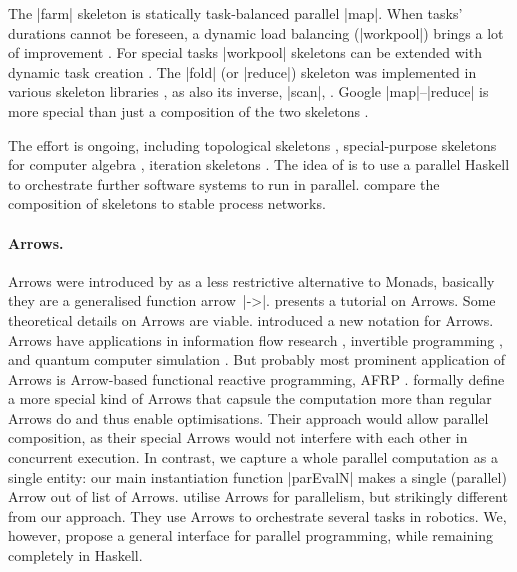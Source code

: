 The |farm| skeleton \citep{Hey1990185,Eden:PPDP01,Kuchen05} is statically task-balanced parallel |map|. When tasks' durations cannot be foreseen, a dynamic load balancing (|workpool|) brings a lot of improvement \citep{Rudolph:1991:SLB:113379.113401,Eden:PPL03,Hippold2006,PADL08HMWS,Marlow2009}. For special tasks |workpool| skeletons can be extended with dynamic task creation \cite{WPEuropar06,Dinan:2009:SWS:1654059.1654113,brown2010ever}.
%
The |fold| (or |reduce|) skeleton was implemented in various skeleton libraries \cite{Kuchen2002,BUONO20102095,Dastgeer:2011:ASM:1984693.1984697,5361825}, as also its inverse, |scan|, \cite{Bischof2002,harris2007parallel}.
%
Google |map|--|reduce| is more special than just a composition of the two skeletons \cite{LAMMEL20081,Berthold2009-mr}.

The effort is ongoing, including topological skeletons \cite{Eden:PARCO05}, special-purpose skeletons for computer algebra \cite{Berthold2009-fft,lobachev-phd,Lobachev2012,janjic2013space}, iteration skeletons \cite{Dieterle2013}. The idea of \citet{scscp} is to use a parallel Haskell to orchestrate further software systems to run in parallel. \citet{dieterle_horstmeyer_loogen_berthold_2016} compare the composition of skeletons to stable process networks.

\paragraph{Arrows.}
Arrows were introduced by \citet{HughesArrows} as a less restrictive alternative to Monads, basically they are a generalised function arrow~|->|. \citet{Hughes2005} presents a tutorial on Arrows. Some theoretical details on Arrows \cite{jacobs_heunen_hasuo_2009,LINDLEY201197,ATKEY201119} are viable. \citet{Paterson:2001:NNA:507669.507664} introduced a new notation for Arrows. Arrows have applications in information flow research \cite{1648705,LI20101974,Russo:2008:LLI:1411286.1411289}, invertible programming \cite{Alimarine:2005:BAA:1088348.1088357}, and quantum computer simulation \cite{vizzotto_altenkirch_sabry_2006}. But probably most prominent application of Arrows is Arrow-based functional reactive programming, AFRP \cite{Nilsson:2002:FRP:581690.581695,Hudak2003,Czaplicki:2013:AFR:2499370.2462161}.
\citet{Liu:2009:CCA:1631687.1596559} formally define a more special kind of Arrows that capsule the computation more than regular Arrows do and thus enable optimisations. Their approach would allow parallel composition, as their special Arrows would not interfere with each other in concurrent execution. In contrast, we capture a whole parallel computation as a single entity: our main instantiation function |parEvalN| makes a single (parallel) Arrow out of list of Arrows. \citet{Huang2007} utilise Arrows for parallelism, but strikingly different from our approach. They use Arrows to orchestrate several tasks in robotics. We, however, propose a general interface for parallel programming, while remaining completely in Haskell.

